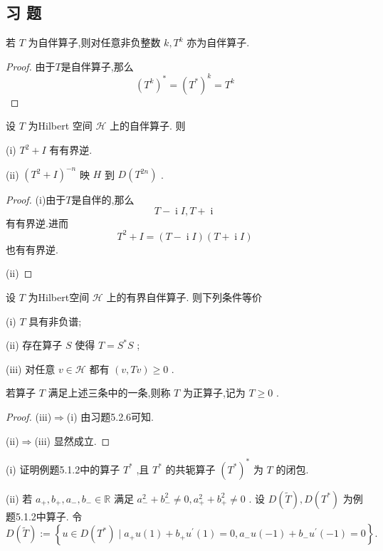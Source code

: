 \documentclass[lang=cn,newtx,10pt,scheme=chinese,thmcnt=chapter]{elegantbook}
\newcommand{\ci}{\operatorname{i}}
\begin{document}
\subsection{习 题}
\begin{problemset}
    \item 若 \(T\) 为自伴算子,则对任意非负整数 \(k,{T}^{k}\) 亦为自伴算子.
    \begin{proof}
        由于$T$是自伴算子,那么\[
        (T^k)^*=(T^*)^k=T^k
        \]
    
    \end{proof}
    \item 设 \(T\) 为Hilbert 空间 \(\mathcal{H}\) 上的自伴算子. 则

(i) \({T}^{2} + I\) 有有界逆.

(ii) \({\left( {T}^{2} + I\right) }^{-n}\) 映 \(H\) 到 \(D\left( {T}^{2n}\right)\) .

\begin{proof}
    (i)由于$T$是自伴的,那么\[T-\ci I,T+\ci\]有有界逆.进而\[
    T^2+I=(T-\ci I)(T+\ci I)
    \]
    也有有界逆.

    (ii) 
\end{proof}
\item  设 \(T\) 为Hilbert空间 \(\mathcal{H}\) 上的有界自伴算子. 则下列条件等价

(i) \(T\) 具有非负谱;

(ii) 存在算子 \(S\) 使得 \(T = {S}^{ * }S\) ;

(iii) 对任意 \(v \in  \mathcal{H}\) 都有 \(\left( {v,{Tv}}\right)  \geq  0\) .

若算子 \(T\) 满足上述三条中的一条,则称 \(T\) 为正算子,记为 \(T \geq  0\) .
\begin{proof}
(iii)$\Rightarrow$(i) 由习题5.2.6可知.

(ii)$\Rightarrow$(iii) 显然成立.


\end{proof}
\item (i) 证明例题5.1.2中的算子 \({T}^{ * }\) ,且 \({T}^{ * }\) 的共轭算子 \({\left( {T}^{ * }\right) }^{ * }\) 为 \(T\) 的闭包.

(ii) 若 \({a}_{ + },{b}_{ + },{a}_{ - },{b}_{ - } \in  \mathbb{R}\) 满足 \({a}_{ - }^{2} + {b}_{ - }^{2} \neq  0,{a}_{ + }^{2} + {b}_{ + }^{2} \neq  0\) . 设 \(D\left( \widetilde{T}\right) ,D\left( {T}^{ * }\right)\) 为例题5.1.2中算子. 令
\begin{equation*}
D\left( \widetilde{T}\right)  \mathrel{\text{ := }} \left\{  {u \in  D\left( {T}^{ * }\right)  \mid  {a}_{ + }u\left( 1\right)  + {b}_{ + }{u}^{\prime }\left( 1\right)  = 0,{a}_{ - }u( - 1) + {b}_{ - }{u}^{\prime }\left( {-1}\right)  = 0}\right\}  .
\end{equation*}


\end{problemset}
\end{document}

